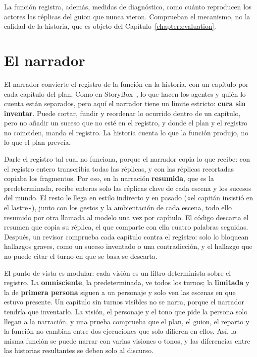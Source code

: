 La función registra, además, medidas de diagnóstico, como cuánto reproducen los actores las réplicas
del guion que nunca vieron. Comprueban el mecanismo, no la calidad de la historia, que es objeto del
Capítulo~\ref{chapter:evaluation}.

\section{El narrador}\label{sec:narrador}

El narrador convierte el registro de la función en la historia, con un capítulo por cada capítulo
del plan. Como en StoryBox~\cite{chen2026a}, lo que hacen los agentes y quién lo cuenta están
separados, pero aquí el narrador tiene un límite estricto: \textbf{cura sin inventar}. Puede cortar,
fundir y reordenar lo ocurrido dentro de un capítulo, pero no añadir un suceso que no esté en el
registro, y donde el plan y el registro no coinciden, manda el registro. La historia cuenta lo que la
función produjo, no lo que el plan preveía.

Darle el registro tal cual no funciona, porque el narrador copia lo que recibe: con el registro
entero transcribía todas las réplicas, y con las réplicas recortadas copiaba los fragmentos. Por
eso, en la narración \textbf{resumida}, que es la predeterminada, recibe enteras solo las réplicas
clave de cada escena y los sucesos del mundo. El resto le llega en estilo indirecto y en pasado
(«el capitán insistió en el lastre»), junto con los gestos y la ambientación de cada escena, todo
ello resumido por otra llamada al modelo una vez por capítulo. El código descarta el resumen que
copia su réplica, el que comparte con ella cuatro palabras seguidas. Después, un revisor comprueba
cada capítulo contra el registro: solo lo bloquean hallazgos graves, como un suceso inventado o una
contradicción, y el hallazgo que no puede citar el turno en que se basa se descarta.

El punto de vista es modular: cada visión es un filtro determinista sobre el registro. La
\textbf{omnisciente}, la predeterminada, ve todos los turnos; la \textbf{limitada} y la de
\textbf{primera persona} siguen a un personaje y solo ven las escenas en que estuvo presente. Un
capítulo sin turnos visibles no se narra, porque el narrador tendría que inventarlo. La visión, el
personaje y el tono que pide la persona solo llegan a la narración, y una prueba comprueba que el
plan, el guion, el reparto y la función no cambian entre dos ejecuciones que solo difieren en ellos.
Así, la misma función se puede narrar con varias visiones o tonos, y las diferencias entre las
historias resultantes se deben solo al discurso.

